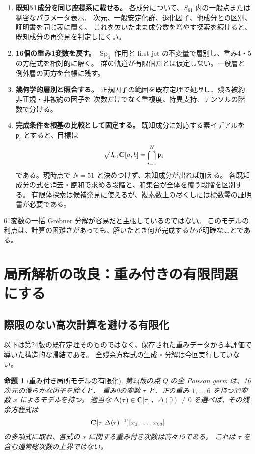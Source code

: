 \documentclass[11pt,a4paper]{ltjsarticle}
\DeclareMathOperator{\Sp}{Sp}\DeclareMathOperator{\CSp}{CSp}
\newtheorem{proposition}{命題}[section]
\theoremstyle{remark}\newtheorem{remark}[proposition]{注意}
\begin{document}
\begin{enumerate}
\item \textbf{既知51成分を同じ座標系に載せる。}
各成分について、$S_{61}$ 内の一般点または稠密なパラメータ表示、
次元、一般安定化群、退化因子、他成分との区別、証明書を同じ表に置く。
これを欠いたまま成分数を増やす探索を続けると、既知成分の再発見を判定しにくい。
\item \textbf{16個の重み1変数を戻す。}
$\Sp_4$ 作用と first-jet の不変量で層別し、重み4・5の方程式を相対的に解く。
群の軌道が有限個だとは仮定しない。一般層と例外層の両方を台帳に残す。
\item \textbf{幾何学的層別と照合する。}
正規因子の範囲を既存定理で処理し、残る被約非正規・非被約の因子を
次数だけでなく重複度、特異支持、テンソルの階数で分ける。
\item \textbf{完成条件を根基の比較として固定する。}
既知成分に対応する素イデアルを $\mathfrak p_i$ とすると、目標は
\[
 \sqrt{I_{61}\mathbf C[a,b]}=\bigcap_{i=1}^{N}\mathfrak p_i
\]
である。現時点で $N=51$ と決めつけず、未知成分が出れば加える。
各既知成分の式を消去・飽和で求める段階と、和集合が全体を覆う段階を区別する。
有限体探索は候補発見に使えるが、複素数上の尽くしには標数零の証明書が必要である。
\end{enumerate}

61変数の一括 Gröbner 分解が容易だと主張しているのではない。
このモデルの利点は、計算の困難さがあっても、解いたとき何が完成するかが明確なことである。

\section{局所解析の改良：重み付きの有限問題にする}

\subsection{際限のない高次計算を避ける有限化}

以下は第24版の既存定理そのものではなく、保存された重みデータから本評価で導いた構造的な帰結である。
全残余方程式の生成・分解は今回実行していない。

\begin{proposition}[重み付き局所モデルの有限化]\label{prop:finite}
第24版の点 $Q$ の全 Poisson germ は、16次元の滑らかな因子を除くと、
重み0の変数 $\tau$ と、正の重み $1,\dots,6$ を持つ33変数 $x$ によるモデルを持つ。
適当な $\Delta(\tau)\in\mathbf C[\tau]$、$\Delta(0)\ne0$ を選べば、その残余方程式は
\[
 \mathbf C[\tau,\Delta(\tau)^{-1}][x_1,\dots,x_{33}]
\]
の多項式に取れ、各式の $x$ に関する重み付き次数は高々19である。
これは $\tau$ を含む通常総次数の上界ではない。
\end{proposition}
\end{document}
